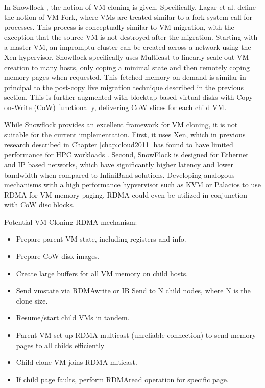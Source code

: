 In Snowflock \cite{lagar2009snowflock, lagar2011snowflock}, the notion of VM cloning is given. Specifically, Lagar et al. define the notion of VM Fork, where VMs are treated similar to a fork\(\) system call for processes.   This process is conceptually similar to VM migration, with the exception that the source VM is not destroyed after the migration. Starting with a master VM, an impromptu cluster can be created across a network using the Xen hypervisor.  Snowflock specifically uses Multicast to linearly scale out VM creation to many hosts, only coping a minimal state and then remotely coping memory pages when requested.  This fetched memory on-demand is similar in principal to the post-copy live migration technique described in the previous section.  This is further augmented with blocktap-based virtual disks with Copy-on-Write (CoW) functionally, delivering CoW slices for each child VM. 

While Snowflock provides an excellent framework for VM cloning, it is not suitable for the current implementation. First, it uses Xen, which in previous research described in Chapter \ref{chap:cloud2011} has found to have limited performance for HPC workloads \cite{Younge2011cloud}.  Second, SnowFlock is designed for Ethernet and IP based networks, which have significantly higher latency and lower bandwidth when compared to InfiniBand solutions.  Developing analogous mechanisms with a high performance hypvervisor such as KVM or Palacios \cite{lange2010palacios} to use RDMA for VM memory paging. RDMA could even be utilized in conjunction with CoW disc blocks.

Potential VM Cloning RDMA mechanism:
\begin{itemize}
\item Prepare parent VM state, including registers and info.
\item Prepare CoW disk images.
\item Create large buffers for all VM memory on child hosts. 
\item Send vmstate via RDMAwrite or IB Send to N child nodes, where N is the clone size.
\item Resume/start child VMs in tandem. 
\item Parent VM set up RDMA multicast (unreliable connection) to send memory pages to all childs efficiently
\item Child clone VM joins RDMA mlticast.
\item If child page faults, perform RDMAread operation for specific page. 
\end{itemize}

